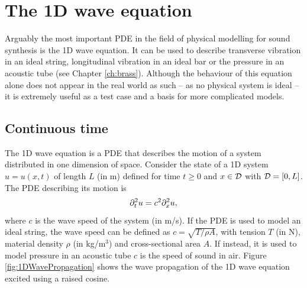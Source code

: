 
    
    
    

\section{%
The 1D wave equation}\label{sec:1DWave}
Arguably the most important PDE in the field of physical modelling for sound synthesis is the 1D wave equation. It can be used to describe transverse vibration in an ideal string, longitudinal vibration in an ideal bar or the pressure in an acoustic tube (see Chapter \ref{ch:brass}). Although the behaviour of this equation alone does not appear in the real world as such -- as no physical system is ideal -- it is extremely useful as a test case and a basis for more complicated models. %

\subsection{Continuous time}
The 1D wave equation is a PDE that describes the motion of a system distributed in one dimension of space. Consider the state of a 1D system $u=u(x,t)$ of length $L$ (in m) defined for time $t\geq 0$ and $x\in \mathcal{D}$ with $\mathcal{D} = [0, L]$. The PDE describing its motion is
\begin{equation}\label{eq:1DwavePDE}
    \partial_t^2 u = c^2 \partial_x^2 u,
\end{equation}
where $c$ is the wave speed of the system (in m/s). If the PDE is used to model an ideal string, the wave speed can be defined as $c = \sqrt{T / \rho A}$, with tension $T$ (in N), material density $\rho$ (in kg/m$^3$) and cross-sectional area $A$. If instead, it is used to model pressure in an acoustic tube $c$ is the speed of sound in air. Figure \ref{fig:1DWavePropagation} shows the wave propagation of the 1D wave equation excited using a raised cosine. 

